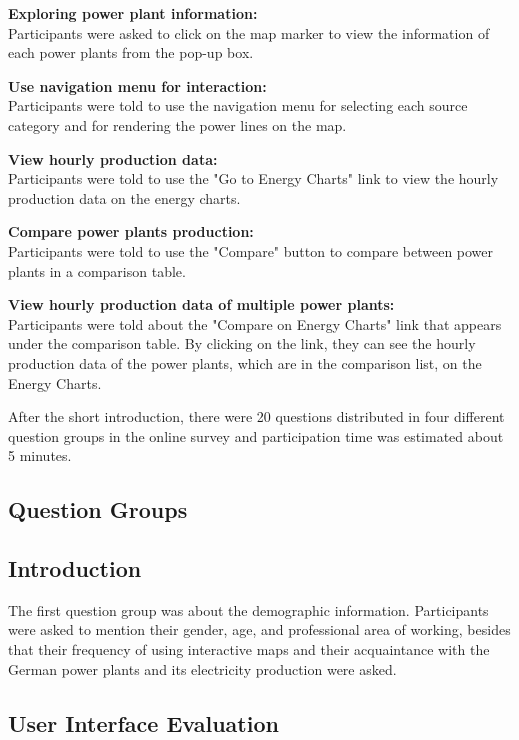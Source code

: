 \textbf{Exploring power plant information:}\\
Participants were asked to click on the map marker to view the information of each power plants from the pop-up box. 

\textbf{Use navigation menu for interaction:}\\
Participants were told to use the navigation menu for selecting each source category and for rendering the power lines on the map.

\textbf{View hourly production data:}\\
Participants were told to use the "Go to Energy Charts" link to view the hourly production data on the energy charts.

\textbf{Compare power plants production:}\\
Participants were told to use the "Compare" button to compare between power plants in a comparison table.

\textbf{View hourly production data of multiple power plants:}\\
Participants were told about the "Compare on Energy Charts" link that appears under the comparison table. By clicking on the link, they can see the hourly production data of the power plants, which are in the comparison list, on the Energy Charts. 

After the short introduction, there were 20 questions distributed in four different question groups in the online survey and participation time was estimated about 5 minutes.  

\subsection{Question Groups}
\label{sssec:quesGroup} 

\subsection*{Introduction}
\label{sssec:intro}

The first question group was about the demographic information. Participants were asked to mention their gender, age, and professional area of working, besides that their frequency of using interactive maps and their acquaintance with the German power plants and its electricity production were asked. 

\subsection*{User Interface Evaluation}
\label{sssec:uiEval}

